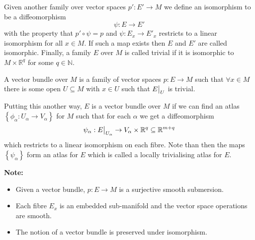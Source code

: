 \documentclass[11pt]{article}
\newcommand\restr[2]{{%
  \left.\kern-\nulldelimiterspace %
  #1 %
  \vphantom{\big|} %
  \right|_{#2} %
  }}
\newcommand{\R}{\mathbb{R}}
\newcommand{\N}{\mathbb{N}}
\newenvironment{defin}
	{\begin{mdframed}[backgroundcolor=white, roundcorner=5pt, linewidth=1pt, linecolor=RoyalBlue]
		\setlength{\parindent}{0pt}}
	{\end{mdframed}}
\newcommand{\mdf}[1]{{\color{RoyalBlue} #1}}
\newenvironment{note}
	{\begin{mdframed}[backgroundcolor=white, linecolor=RubineRed, roundcorner=5pt, linewidth=1pt]\bfseries{Note:}\normalfont
	\setlength{\parindent}{0pt}}
	{\end{mdframed}}
\begin{document}
Given another family over vector spaces $p':E'\to M$ we define an \mdf{isomorphism} to be a diffeomorphism 
\[
\psi:E\to E'
\]
with the property that $p'\circ\psi = p$ and $\psi:E_x\to E'_x$ restricts to  a linear isomorphism for all $x\in M$.
If such a map exists then $E$ and $E'$ are called \mdf{isomorphic}.
Finally, a family $E$ over $M$ is called \mdf{trivial} if it is isomorphic to $M\times \R^q$ for some $q\in\N$.

\begin{figure}[H]
	\centering
\end{figure}

\begin{defin}
	A \mdf{vector bundle} over $M$ is a family of vector spaces $p:E\to M$ such that $\forall x\in M$ there is some open $U\subseteq M$ with $x\in U$ such that $\restr{E}{U}$ is trivial.
\end{defin}

Putting this another way, $E$ is a vector bundle over $M$ if we can find an atlas $\left\{\phi_\alpha : U_\alpha \to V_\alpha \right\}$ for $M$ such that for each $\alpha$ we get a diffeomorphism
\[
	\psi_\alpha: \restr{E}{U_\alpha}\to V_\alpha\times\R^q\subseteq\R^{m+q}
\]
which restricts to a linear isomorphism on each fibre.
Note than then the maps $\left\{\psi_\alpha\right\}$ form an atlas for $E$ which is called a \mdf{locally trivialising atlas} for $E$.
\begin{note}
	\begin{itemize}
		\item Given a vector bundle, $p:E\to M$ is a surjective smooth submersion.
		\item Each fibre $E_x$ is an embedded sub-manifold and the vector space operations are smooth.
		\item The notion of a vector bundle is preserved under isomorphism.
	\end{itemize}
\end{note}
\end{document}
